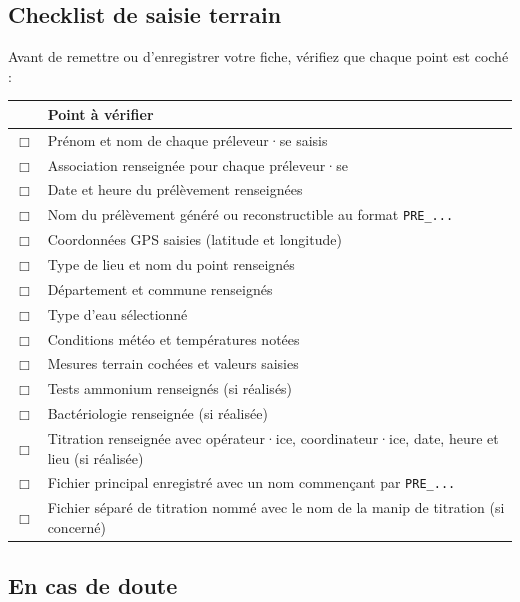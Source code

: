 \documentclass[12pt, a4paper]{article}
\begin{document}
\subsection{Checklist de saisie terrain}

Avant de remettre ou d'enregistrer votre fiche, vérifiez que
chaque point est coché :

\begin{center}
\begin{tabularx}{0.88\linewidth}{C{0.8cm} L{10.5cm}}
  \toprule
  \textbf{} & \textbf{Point à vérifier} \\
  \midrule
  $\Box$ & Prénom et nom de chaque préleveur·se saisis \\
  $\Box$ & Association renseignée pour chaque préleveur·se \\
  $\Box$ & Date et heure du prélèvement renseignées \\
  $\Box$ & Nom du prélèvement généré ou reconstructible au format \texttt{PRE\_...} \\
  $\Box$ & Coordonnées GPS saisies (latitude et longitude) \\
  $\Box$ & Type de lieu et nom du point renseignés \\
  $\Box$ & Département et commune renseignés \\
  $\Box$ & Type d'eau sélectionné \\
  $\Box$ & Conditions météo et températures notées \\
  $\Box$ & Mesures terrain cochées et valeurs saisies \\
  $\Box$ & Tests ammonium renseignés (si réalisés) \\
  $\Box$ & Bactériologie renseignée (si réalisée) \\
  $\Box$ & Titration renseignée avec opérateur·ice, coordinateur·ice, date, heure et lieu (si réalisée) \\
  $\Box$ & Fichier principal enregistré avec un nom commençant par \texttt{PRE\_...} \\
  $\Box$ & Fichier séparé de titration nommé avec le nom de la manip de titration (si concerné) \\
  \bottomrule
\end{tabularx}
\end{center}

\subsection{En cas de doute}
\end{document}

